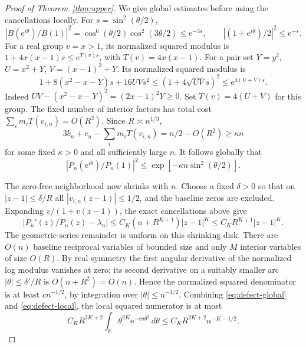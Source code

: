 \documentclass[11pt]{article}
\theoremstyle{remark}\newtheorem{remark}[theorem]{Remark}
\newcommand{\ee}{\mathrm e}
\begin{document}
\begin{proof}[Proof of Theorem~\ref{thm:upper}]
We give global estimates before using the cancellations locally.
For \(s=\sin^2(\theta/2)\),
\[
 |B(\ee^{i\theta})/B(1)|^2
 =\cos^6(\theta/2)\cos^2(3\theta/2)\le\ee^{-3s},
 \qquad |(1+\ee^{i\theta})/2|^2\le\ee^{-s}.
\]
For a real group \(v=x>1\), its normalized squared modulus is
\(1+4x(x-1)s\le\ee^{T(v)s}\), with \(T(v)=4x(x-1)\).
For a pair set \(Y=y^2\), \(U=x^2+Y\), \(V=(x-1)^2+Y\).
Its normalized squared modulus is
\[
 1+8(x^2-x-Y)s+16UVs^2
 \le(1+4\sqrt{UV}s)^2\le\ee^{4(U+V)s}.
\]
Indeed \(UV-(x^2-x-Y)^2=(2x-1)^2Y\ge0\).
Set \(T(v)=4(U+V)\) for this group. The fixed number of
interior factors has total cost \(\sum_i m_iT(v_{i,n})=O(R^2)\).
Since \(R\asymp n^{1/3}\),
\[
 3b_n+c_n-\sum_i m_iT(v_{i,n})=n/2-O(R^2)\ge\kappa n
\]
for some fixed \(\kappa>0\) and all sufficiently large \(n\).
It follows globally that
\begin{equation}\label{eq:defect-global}
 |P_n(\ee^{i\theta})/P_n(1)|^2
 \le\exp[-\kappa n\sin^2(\theta/2)].
\end{equation}

The zero-free neighborhood now shrinks with \(n\). Choose a fixed
\(\delta>0\) so that on \(|z-1|\le\delta/R\) all
\(|v_{i,n}(z-1)|\le1/2\), and the baseline zeros are excluded.
Expanding \(v/(1+v(z-1))\), the exact cancellations above give
\begin{equation}\label{eq:defect-local}
 |P_n'(z)/P_n(z)-\lambda_n|
 \le C_K(n+R^{K+1})|z-1|^K
 \le C_KR^{K+1}|z-1|^K.
\end{equation}
The geometric-series remainder is uniform on this shrinking disk.
There are \(O(n)\) baseline reciprocal variables of bounded size
and only \(M\) interior variables of size \(O(R)\).
By real symmetry the first angular derivative of the normalized
log modulus vanishes at zero; its second derivative on a suitably
smaller arc \(|\theta|\le\delta'/R\) is \(O(n+R^2)=O(n)\).
Hence the normalized squared denominator is at least \(c n^{-1/2}\),
by integration over \(|\theta|\le n^{-1/2}\).
Combining \eqref{eq:defect-global} and \eqref{eq:defect-local},
the local squared numerator is at most
\[
 C_KR^{2K+2}\int_{\mathbb R}\theta^{2K}\ee^{-c n\theta^2}\,d\theta
 \le C_K R^{2K+2}n^{-K-1/2}.
\]


\end{proof}
\end{document}
